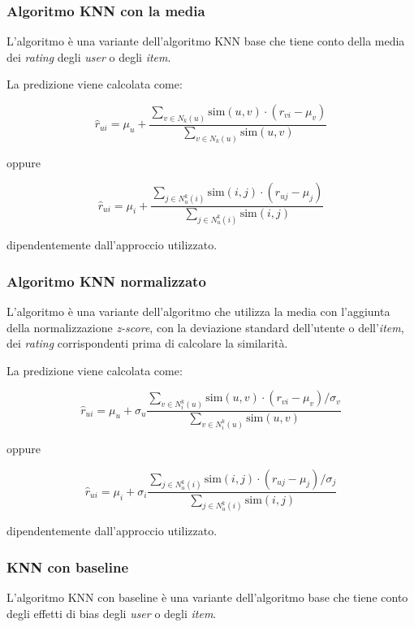 \subsubsection{Algoritmo KNN con la media}
\label{algoritmo-knn-con-la-media}

L'algoritmo è una variante dell'algoritmo KNN base che tiene conto della media dei \emph{rating} degli \emph{user} o degli \emph{item}.

La predizione viene calcolata come:

\[
\hat{r}_{ui} = \mu_u + \frac{\sum_{v \in N_k(u)} \text{sim}(u, v) \cdot (r_{vi} - \mu_v)}{\sum_{v \in N_k(u)} \text{sim}(u, v)}
\]

oppure

\[
\hat{r}_{ui} = \mu_i + \frac{\sum_{j \in N^k_u(i)} \text{sim}(i, j) \cdot (r_{uj} - \mu_j)}{\sum_{j \in N^k_u(i)} \text{sim}(i, j)}
\]

dipendentemente dall'approccio utilizzato.

\subsubsection{Algoritmo KNN normalizzato}
\label{algoritmo-knn-normalizzato}

L'algoritmo è una variante dell'algoritmo che utilizza la media con l'aggiunta della normalizzazione \emph{z-score}, con la deviazione standard dell'utente o dell'\emph{item}, dei \emph{rating} corrispondenti prima di calcolare la similarità.

La predizione viene calcolata come:

\[
\hat{r}_{ui} = \mu_u + \sigma_u \frac{\sum_{v \in N^k_i(u)} \text{sim}(u, v) \cdot (r_{vi} - \mu_v) / \sigma_v}{\sum_{v \in N^k_i(u)} \text{sim}(u, v)}
\]

oppure

\[
\hat{r}_{ui} = \mu_i + \sigma_i \frac{\sum_{j \in N^k_u(i)} \text{sim}(i, j) \cdot (r_{uj} - \mu_j) / \sigma_j}{\sum_{j \in N^k_u(i)} \text{sim}(i, j)}
\]

dipendentemente dall'approccio utilizzato.

\subsubsection{KNN con baseline}
\label{knn-con-baseline}

L'algoritmo KNN con baseline \cite{KNN_baseline} è una variante dell'algoritmo base che tiene conto degli effetti di bias degli \emph{user} o degli \emph{item}.

